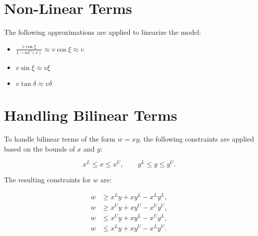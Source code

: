 \section{Non-Linear Terms}

The following approximations are applied to linearize the model:

\begin{itemize}
	\item $\frac{v \cos\xi}{1 - nC(s)} \approx v \cos\xi \approx v$
	\item $v \sin\xi \approx v \xi$
	\item $v \tan\delta \approx v \delta$
\end{itemize}

\section{Handling Bilinear Terms}

To handle bilinear terms of the form \(w = xy\), the following constraints are applied based on the bounds of \(x\) and \(y\):

\[
	x^L \leq x \leq x^U, \qquad y^L \leq y \leq y^U.
\]

The resulting constraints for \(w\) are:

\[
	\begin{aligned}
		w & \geq x^L y + x y^L - x^L y^L, \\
		w & \geq x^U y + x y^U - x^U y^U, \\
		w & \leq x^U y + x y^L - x^U y^L, \\
		w & \leq x^L y + x y^U - x^L y^U.
	\end{aligned}
\]
